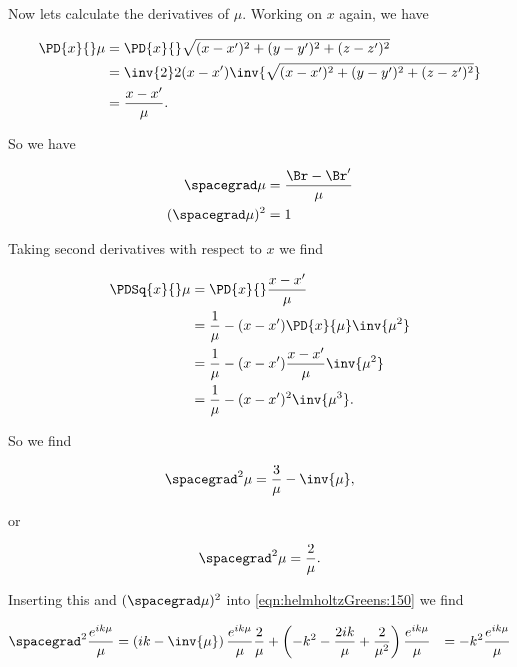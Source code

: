 Now lets calculate the derivatives of $\mu$.  Working on $x$ again, we have

\begin{align*}
\PD{x}{} \mu
&=
\PD{x}{} \sqrt{ 
(x - x')^2 
+(y - y')^2 
+(z - z')^2 
} \\
&=
\inv{2} 2 (x - x')
\inv{\sqrt{ 
(x - x')^2 
+(y - y')^2 
+(z - z')^2 
}} \\
&=
\frac{x - x'}{\mu}.
\end{align*}

So we have

\begin{align}\label{eqn:helmholtzGreens:170}
\spacegrad \mu &= \frac{\Br - \Br'}{\mu} \\
(\spacegrad \mu)^2 &= 1 
\end{align}

Taking second derivatives with respect to $x$ we find

\begin{align*}
\PDSq{x}{} \mu
&= \PD{x}{}
\frac{x - x'}{\mu} \\
&= 
\frac{1}{\mu} 
- (x - x') \PD{x}{\mu} \inv{\mu^2}
\\
&=
\frac{1}{\mu} 
- (x - x') \frac{x - x'}{\mu} \inv{\mu^2}
\\
&=
\frac{1}{\mu} 
- (x - x')^2 \inv{\mu^3}.
\end{align*}

So we find

\begin{equation}\label{eqn:helmholtzGreens:190}
\spacegrad^2 \mu = 
\frac{3}{\mu} 
- \inv{\mu},
\end{equation}

or

\begin{equation}\label{eqn:helmholtzGreens:210}
\spacegrad^2 \mu = \frac{2}{\mu}.
\end{equation}

Inserting this and $(\spacegrad \mu)^2$ into \ref{eqn:helmholtzGreens:150} we find

\begin{equation}\label{eqn:helmholtzGreens:n}
\begin{aligned}
\spacegrad^2
\frac{e^{i k \mu} }{\mu} 
&=
\left( i k - \inv{\mu} \right) \frac{e^{i k \mu}}{\mu} \frac{2}{\mu}
+
\left( -k^2 - \frac{ 2 i k }{\mu} + \frac{2}{\mu^2} \right)
\frac{e^{i k \mu}}{\mu}
&=
-k^2 \frac{e^{i k \mu}}{\mu}
\end{aligned}
\end{equation}

